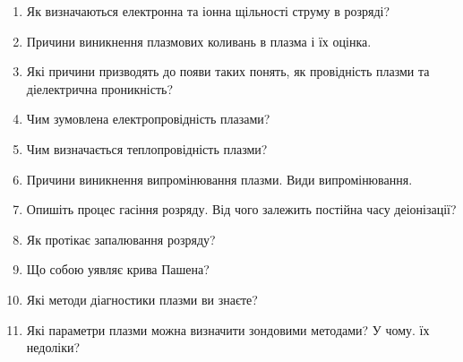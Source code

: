 \documentclass[a4paper,14pt]{extreport}
\begin{document}
\begin{landscape}
\begin{enumerate}
	\item  Як визначаються електронна та іонна щільності струму в розряді?
	\item  Причини виникнення плазмових коливань в плазма і їх оцінка.
	\item  Які причини призводять до появи таких понять, як провідність плазми та діелектрична проникність?
	\item  Чим зумовлена електропровідність плазами?
	\item  Чим визначається теплопровідність плазми?
	\item  Причини виникнення випромінювання плазми. Види випромінювання.
	\item  Опишіть процес гасіння розряду. Від чого залежить постійна часу деіонізації?
	\item  Як протікає запалювання розряду?
	\item  Що собою уявляє крива Пашена?
	\item  Які методи діагностики плазми ви знаєте?
	\item  Які параметри плазми можна визначити зондовими методами? У чому. їх недоліки?

\end{enumerate}
\end{landscape}
\end{document}
